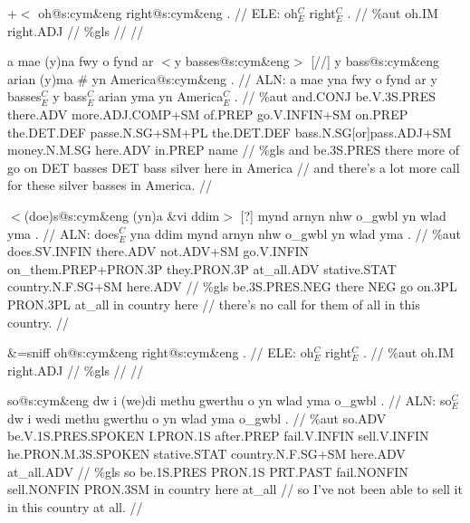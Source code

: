 \documentclass[a4paper,10pt]{article}
\begin{document}
\ex
\begingl[lingstyle=gergl]
\glchat +$<$ oh@s:cym\&eng right@s:cym\&eng . //
\glsurface ELE:  oh$^{C}_{E}$ right$^{C}_{E}$ .  //
\glauto \%aut  oh{\scriptsize .IM} right{\scriptsize .ADJ}   //
\glmanual \%gls      //
\gleng  //
\endgl
\xe

\ex
\begingl[lingstyle=gergl]
\glchat a mae (y)na fwy o fynd ar $<$y basses@s:cym\&eng$>$ [//] y bass@s:cym\&eng arian (y)ma \# yn America@s:cym\&eng . //
\glsurface ALN:  a mae yna fwy o fynd ar y basses$^{C}_{E}$ y bass$^{C}_{E}$ arian yma yn America$^{C}_{E}$ .  //
\glauto \%aut  and{\scriptsize .CONJ} be{\scriptsize .V.3S.PRES} there{\scriptsize .ADV} more{\scriptsize .ADJ.COMP+SM} of{\scriptsize .PREP} go{\scriptsize .V.INFIN+SM} on{\scriptsize .PREP} the{\scriptsize .DET.DEF} passe{\scriptsize .N.SG+SM+PL} the{\scriptsize .DET.DEF} bass{\scriptsize .N.SG[or]pass.ADJ+SM} money{\scriptsize .N.M.SG} here{\scriptsize .ADV} in{\scriptsize .PREP} name   //
\glmanual \%gls  and be{\scriptsize .3S.PRES} there more of go on DET basses DET bass silver here in America   //
\gleng and there's a lot more call for these silver basses in America. //
\endgl
\xe

\ex
\begingl[lingstyle=gergl]
\glchat $<$(doe)s@s:cym\&eng (yn)a \&vi ddim$>$ [?] mynd arnyn nhw o\_gwbl yn wlad yma . //
\glsurface ALN:  does$^{C}_{E}$ yna ddim mynd arnyn nhw o\_gwbl yn wlad yma .  //
\glauto \%aut  does{\scriptsize .SV.INFIN} there{\scriptsize .ADV} not{\scriptsize .ADV+SM} go{\scriptsize .V.INFIN} on\_them{\scriptsize .PREP+PRON.3P} they{\scriptsize .PRON.3P} at\_all{\scriptsize .ADV} stative{\scriptsize .STAT} country{\scriptsize .N.F.SG+SM} here{\scriptsize .ADV}   //
\glmanual \%gls  be{\scriptsize .3S.PRES.NEG} there NEG go on{\scriptsize .3PL} PRON{\scriptsize .3PL} at\_all in country here   //
\gleng there's no call for them of all in this country. //
\endgl
\xe

\ex
\begingl[lingstyle=gergl]
\glchat \&=sniff oh@s:cym\&eng right@s:cym\&eng . //
\glsurface ELE:  oh$^{C}_{E}$ right$^{C}_{E}$ .  //
\glauto \%aut  oh{\scriptsize .IM} right{\scriptsize .ADJ}   //
\glmanual \%gls      //
\gleng  //
\endgl
\xe

\ex
\begingl[lingstyle=gergl]
\glchat so@s:cym\&eng dw i (we)di methu gwerthu o yn wlad yma o\_gwbl . //
\glsurface ALN:  so$^{C}_{E}$ dw i wedi methu gwerthu o yn wlad yma o\_gwbl .  //
\glauto \%aut  so{\scriptsize .ADV} be{\scriptsize .V.1S.PRES.SPOKEN} I{\scriptsize .PRON.1S} after{\scriptsize .PREP} fail{\scriptsize .V.INFIN} sell{\scriptsize .V.INFIN} he{\scriptsize .PRON.M.3S.SPOKEN} stative{\scriptsize .STAT} country{\scriptsize .N.F.SG+SM} here{\scriptsize .ADV} at\_all{\scriptsize .ADV}   //
\glmanual \%gls  so be{\scriptsize .1S.PRES} PRON{\scriptsize .1S} PRT{\scriptsize .PAST} fail{\scriptsize .NONFIN} sell{\scriptsize .NONFIN} PRON{\scriptsize .3SM} in country here at\_all   //
\gleng so I've not been able to sell it in this country at all. //
\endgl
\xe
\end{document}
